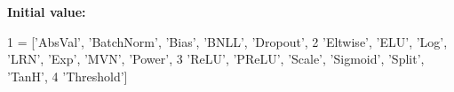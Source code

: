 {\bfseries Initial value\+:}
\begin{DoxyCode}
1 =  [\textcolor{stringliteral}{'AbsVal'}, \textcolor{stringliteral}{'BatchNorm'}, \textcolor{stringliteral}{'Bias'}, \textcolor{stringliteral}{'BNLL'}, \textcolor{stringliteral}{'Dropout'},
2                        \textcolor{stringliteral}{'Eltwise'}, \textcolor{stringliteral}{'ELU'}, \textcolor{stringliteral}{'Log'}, \textcolor{stringliteral}{'LRN'}, \textcolor{stringliteral}{'Exp'}, \textcolor{stringliteral}{'MVN'}, \textcolor{stringliteral}{'Power'},
3                        \textcolor{stringliteral}{'ReLU'}, \textcolor{stringliteral}{'PReLU'}, \textcolor{stringliteral}{'Scale'}, \textcolor{stringliteral}{'Sigmoid'}, \textcolor{stringliteral}{'Split'}, \textcolor{stringliteral}{'TanH'},
4                        \textcolor{stringliteral}{'Threshold'}]
\end{DoxyCode}
